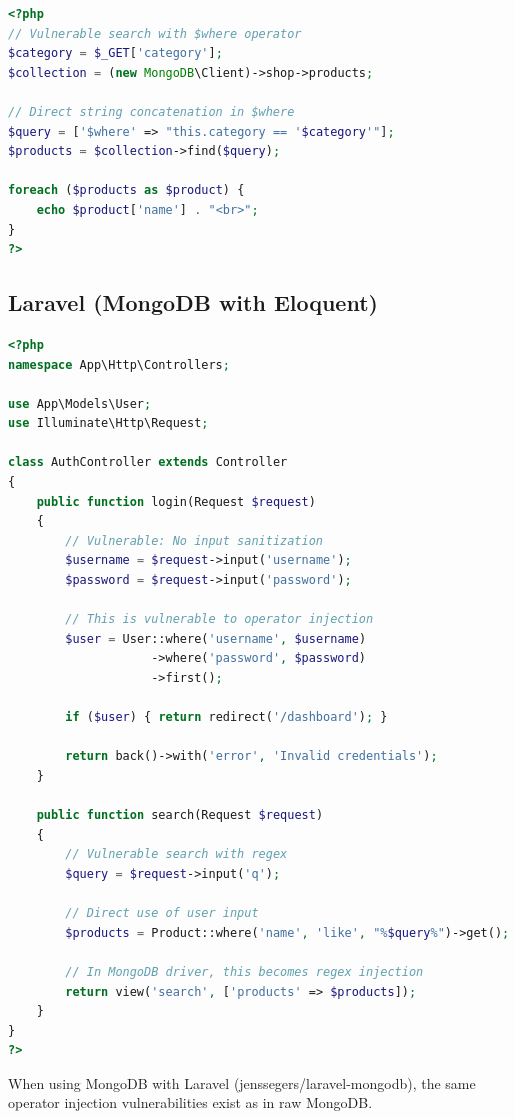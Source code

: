 \documentclass[12pt]{article}
\begin{document}
\begin{lstlisting}[language=PHP, caption=Vulnerable Search Function]
<?php
// Vulnerable search with $where operator
$category = $_GET['category'];
$collection = (new MongoDB\Client)->shop->products;

// Direct string concatenation in $where
$query = ['$where' => "this.category == '$category'"];
$products = $collection->find($query);

foreach ($products as $product) {
    echo $product['name'] . "<br>";
}
?>
\end{lstlisting}

\subsection{Laravel (MongoDB with Eloquent)}

\begin{lstlisting}[language=PHP, caption=Vulnerable Laravel/MongoDB Code]
<?php
namespace App\Http\Controllers;

use App\Models\User;
use Illuminate\Http\Request;

class AuthController extends Controller
{
    public function login(Request $request)
    {
        // Vulnerable: No input sanitization
        $username = $request->input('username');
        $password = $request->input('password');
        
        // This is vulnerable to operator injection
        $user = User::where('username', $username)
                    ->where('password', $password)
                    ->first();
        
        if ($user) { return redirect('/dashboard'); }
        
        return back()->with('error', 'Invalid credentials');
    }
    
    public function search(Request $request)
    {
        // Vulnerable search with regex
        $query = $request->input('q');
        
        // Direct use of user input
        $products = Product::where('name', 'like', "%$query%")->get();
        
        // In MongoDB driver, this becomes regex injection
        return view('search', ['products' => $products]);
    }
}
?>
\end{lstlisting}

\begin{warningbox}
When using MongoDB with Laravel (jenssegers/laravel-mongodb), the same operator injection vulnerabilities exist as in raw MongoDB.
\end{warningbox}
\end{document}
